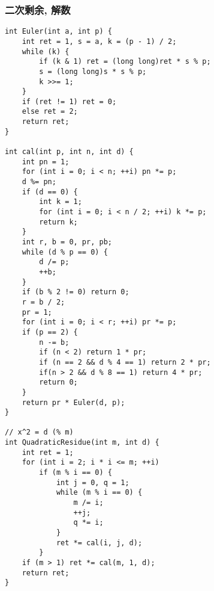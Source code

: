 \subsubsection{二次剩余, 解数}
\begin{verbatim}
int Euler(int a, int p) {
    int ret = 1, s = a, k = (p - 1) / 2;
    while (k) {
        if (k & 1) ret = (long long)ret * s % p;
        s = (long long)s * s % p;
        k >>= 1;
    }
    if (ret != 1) ret = 0;
    else ret = 2;
    return ret;
}        

int cal(int p, int n, int d) {
    int pn = 1;
    for (int i = 0; i < n; ++i) pn *= p;
    d %= pn;
    if (d == 0) {
        int k = 1;
        for (int i = 0; i < n / 2; ++i) k *= p;
        return k;
    }
    int r, b = 0, pr, pb;
    while (d % p == 0) {
        d /= p;
        ++b;
    }
    if (b % 2 != 0) return 0;
    r = b / 2;
    pr = 1;
    for (int i = 0; i < r; ++i) pr *= p;
    if (p == 2) {
        n -= b;
        if (n < 2) return 1 * pr;
        if (n == 2 && d % 4 == 1) return 2 * pr;
        if(n > 2 && d % 8 == 1) return 4 * pr;
        return 0;
    }
    return pr * Euler(d, p);
}

// x^2 = d (% m)
int QuadraticResidue(int m, int d) {
    int ret = 1;
    for (int i = 2; i * i <= m; ++i)
        if (m % i == 0) {
            int j = 0, q = 1;
            while (m % i == 0) {
                m /= i;
                ++j;
                q *= i;
            }
            ret *= cal(i, j, d);
        }
    if (m > 1) ret *= cal(m, 1, d);
    return ret;
}
\end{verbatim}
